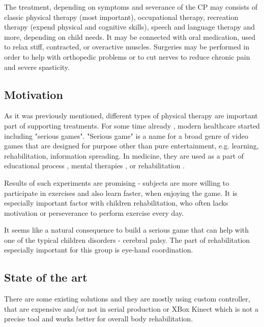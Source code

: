 \documentclass[10pt,a4paper]{article}
\begin{document}
The treatment, depending on symptoms and severance of the CP may consists of classic physical therapy (most important), occupational therapy, recreation therapy (expend physical and cognitive skills), speech and language therapy and more, depending on child needs. It may be connected with oral medication, used to relax stiff, contracted, or overactive muscles. Surgeries may be performed in order to help with orthopedic problems or to cut nerves to reduce chronic pain and severe spasticity.

\subsection*{Motivation}

As it was previously mentioned, different types of physical therapy are important part of supporting treatments. For some time already \cite{rehabilitation}, modern healthcare started including "serious games".  "Serious game" is a name for a broad genre of video games that are designed for purpose other than pure entertainment, e.g. learning, rehabilitation, information spreading. In medicine, they are used as a part of educational process \cite{exercise}, mental therapies \cite{mental_game, mental}, or rehabilitation \cite{physical_rehab, stroke_rehab}. 

Results of such experiments are promising - subjects are more willing to participate in exercises and also learn faster, when enjoying the game. It is especially important factor with children rehabilitation, who often lacks motivation or perseverance to perform exercise every day. 

It seems like a natural consequence to build a serious game that can help with one of the typical children disorders - cerebral palsy. The part of rehabilitation especially important for this group is eye-hand coordination.

\subsection*{State of the art}
There are some existing solutions and they are mostly using custom controller\cite{game_custom}, that are expensive and/or not in serial production or XBox Kinect \cite{game_xbox_360} which is not a precise tool and works better for overall body rehabilitation. 
\end{document}
